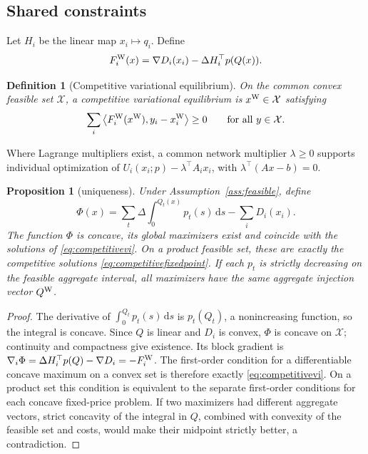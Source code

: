 \documentclass[11pt]{article}
\newtheorem{definition}[assumption]{Definition}
\newtheorem{proposition}[assumption]{Proposition}
\theoremstyle{remark}
\newcommand{\X}{\mathcal X}
\newcommand{\dd}{\mathrm d}
\begin{document}
\subsection{Shared constraints}

Let $H_i$ be the linear map $x_i\mapsto q_i$. Define
\begin{equation}
 F_i^{\rm W}(x)=\nabla D_i(x_i)-\Delta H_i^\top p(Q(x)).
 \label{eq:competitivefield}
\end{equation}

\begin{definition}[Competitive variational equilibrium]
On the common convex feasible set $\X$, a competitive variational equilibrium
is $x^{\rm W}\in\X$ satisfying
\begin{equation}
 \sum_i\left\langle F_i^{\rm W}(x^{\rm W}),y_i-x_i^{\rm W}\right\rangle
 \ge0\qquad\text{for all }y\in\X.
 \label{eq:competitivevi}
\end{equation}
\end{definition}


Where Lagrange multipliers exist, a common network multiplier $\lambda\ge0$
supports individual optimization of
$U_i(x_i;p)-\lambda^\top A_ix_i$, with
$\lambda^\top(Ax-b)=0$.

\begin{proposition}[uniqueness]
\label{prop:potential}
Under Assumption~\ref{ass:feasible}, define
\begin{equation}
 \Phi(x)=\sum_t\Delta\int_0^{Q_t(x)}p_t(s)\,\dd s
                  -\sum_iD_i(x_i).
 \label{eq:potential}
\end{equation}
The function $\Phi$ is concave, its global maximizers exist and coincide
with the solutions of \eqref{eq:competitivevi}. On a product feasible set,
these are exactly the competitive solutions
\eqref{eq:competitivefixedpoint}. If each $p_t$ is strictly decreasing on
the feasible aggregate interval, all maximizers have the same aggregate
injection vector $Q^{\rm W}$. 
\end{proposition}

\begin{proof}
The derivative of $\int_0^{Q_t}p_t(s)\,\dd s$ is $p_t(Q_t)$, a
nonincreasing function, so the integral is concave. Since $Q$ is linear and
$D_i$ is convex, $\Phi$ is concave on $\X$; continuity and compactness give
existence. Its block gradient is
$\nabla_i\Phi=\Delta H_i^\top p(Q)-\nabla D_i=-F_i^{\rm W}$.
The first-order condition for a differentiable concave maximum on a convex
set is therefore exactly \eqref{eq:competitivevi}. On a product set this
condition is equivalent to the separate first-order conditions for each
concave fixed-price problem. If two maximizers had different aggregate
vectors, strict concavity of the integral in $Q$, combined with convexity of
the feasible set and costs, would make their midpoint strictly better, a
contradiction.
\end{proof}
\end{document}
